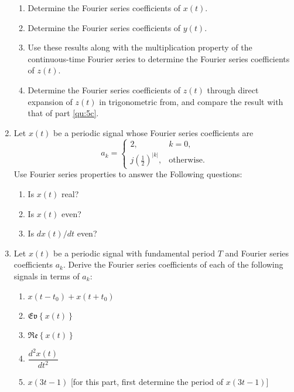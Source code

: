 \documentclass[11pt]{article}
\begin{document}
\begin{enumerate}
    \begin{enumerate}
        \item Determine the Fourier series coefficients of $x(t)$.
        \item Determine the Fourier series coefficients of $y(t)$.
        \item \label{qu:5c} Use these results along with the multiplication property of the continuous-time Fourier series to determine the Fourier series coefficients of $z(t)$.
        \item Determine the Fourier series coefficients of $z(t)$ through direct expansion of $z(t)$ in trigonometric from, and compare the result with that of part \ref{qu:5c}.
    \end{enumerate}


\item Let $x(t)$ be a periodic signal whose Fourier series coefficients are
    \begin{equation*}
        a_k = \begin{cases} 2, &  k=0 ,\\ j\left(\frac{1}{2}\right)^{|k|}, & \text{otherwise}.       \end{cases}
    \end{equation*}
    Use Fourier series properties to answer the Following questions:
    \begin{enumerate}
        \item Is $x(t)$ real?
        \item Is $x(t)$ even?
        \item Is $dx(t)/dt$ even?
    \end{enumerate}

\item Let $x(t)$ be a periodic signal with fundamental period $T$ and Fourier series coefficients $a_k$. Derive the Fourier series coefficients of each of the following signals in terms of $a_k$:
    \begin{enumerate}
        \item $x(t-t_0) + x(t+t_0)$
        \item $\mathfrak{Ev}\left\{x(t)\right\}$
        \item $\mathfrak{Re}\left\{x(t)\right\}$
        \item $\dfrac{d^2 x(t)}{dt^2}$
        \item $x(3t -1)$ [for this part, first determine the period of $x(3t -1)$]
    \end{enumerate}



\end{enumerate}
\end{document}
